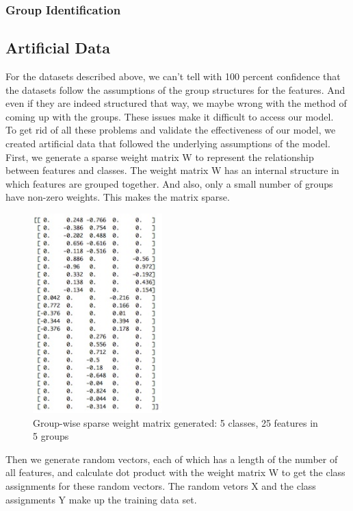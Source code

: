 \documentclass[11pt]{article}
\begin{document}
\subsubsection{Group Identification}

\subsection{Artificial Data}

For the datasets described above, we can't tell with 100 percent confidence that the datasets follow the assumptions of the group structures for the features. And even if they are indeed structured that way, we maybe wrong with the method of coming up with the groups. These issues make it difficult to access our model.\\ 

To get rid of all these problems and validate the effectiveness of our model, we created artificial data that followed the underlying assumptions of the model. First, we generate a sparse weight matrix W to represent the relationship between features and classes. The weight matrix W has an internal structure in which features are grouped together. And also, only a small number of groups have non-zero weights. This makes the matrix sparse.\\ 

\begin{figure}[ht]
\begin{center}
	\includegraphics[width=5cm, natwidth=200, natheight=206]{m_img}
	\caption{Group-wise sparse weight matrix generated: 5 classes, 25 features in 5 groups}
\end{center}
\end{figure}

Then we generate random vectors, each of which has a length of the number of all features, and calculate dot product with the weight matrix W to get the class assignments for these random vectors. The random vetors X and the class assignments Y make up the training data set. \\
\end{document}
